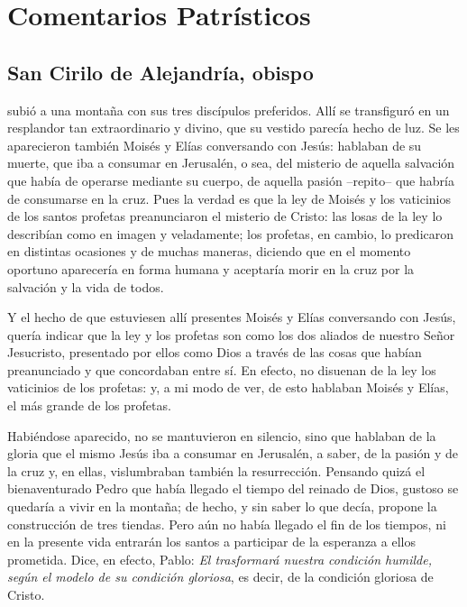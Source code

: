 \newsection
\section{Comentarios Patrísticos}

\subsection{San Cirilo de Alejandría, obispo}



\begin{body}
 subió a una montaña con sus tres discípulos preferidos. Allí se transfiguró en un resplandor tan extraordinario y divino, que su vestido parecía hecho de luz. Se les aparecieron también Moisés y Elías conversando con Jesús: hablaban de su muerte, que iba a consumar en Jerusalén, o sea, del misterio de aquella salvación que había de operarse mediante su cuerpo, de aquella pasión –repito– que habría de consumarse en la cruz. Pues la verdad es que la ley de Moisés y los vaticinios de los santos profetas preanunciaron el misterio de Cristo: las losas de la ley lo describían como en imagen y veladamente; los profetas, en cambio, lo predicaron en distintas ocasiones y de muchas maneras, diciendo que en el momento oportuno aparecería en forma humana y aceptaría morir en la cruz por la salvación y la vida de todos.

Y el hecho de que estuviesen allí presentes Moisés y Elías conversando con Jesús, quería indicar que la ley y los profetas son como los dos aliados de nuestro Señor Jesucristo, presentado por ellos como Dios a través de las cosas que habían preanunciado y que concordaban entre sí. En efecto, no disuenan de la ley los vaticinios de los profetas: y, a mi modo de ver, de esto hablaban Moisés y Elías, el más grande de los profetas.

Habiéndose aparecido, no se mantuvieron en silencio, sino que hablaban de la gloria que el mismo Jesús iba a consumar en Jerusalén, a saber, de la pasión y de la cruz y, en ellas, vislumbraban también la resurrección. Pensando quizá el bienaventurado Pedro que había llegado el tiempo del reinado de Dios, gustoso se quedaría a vivir en la montaña; de hecho, y sin saber lo que decía, propone la construcción de tres tiendas. Pero aún no había llegado el fin de los tiempos, ni en la presente vida entrarán los santos a participar de la esperanza a ellos prometida. Dice, en efecto, Pablo: \textit{El trasformará nuestra condición humilde, según el modelo de su condición gloriosa}, es decir, de la condición gloriosa de Cristo.


\end{body}
